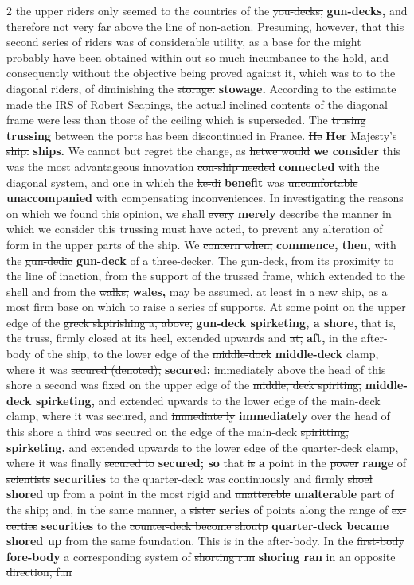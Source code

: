 \documentclass[10pt]{article}
\begin{document}
\begin{multicols}{2}
the upper riders only seemed to the countries of the \sout{you-decks,} \textbf{gun-decks,} and therefore not very far above the line of non-action. Presuming, however, that this second series of riders was of considerable utility, as a base for the might probably have been obtained within out so much incumbance to the hold, and consequently without the objective being proved against it, which was to to the diagonal riders, of diminishing the \sout{storage.} \textbf{stowage.} According to the estimate made the IRS of Robert Seapings, the actual inclined contents of the diagonal frame were less than those of the ceiling which is superseded. The \sout{trusing} \textbf{trussing} between the ports has been discontinued in France. \sout{He} \textbf{Her} Majesty's \sout{ship.} \textbf{ships.} We cannot but regret the change, as \sout{hetwe would} \textbf{we consider} this was the most advantageous innovation \sout{con-ship needed} \textbf{connected} with the diagonal system, and one in which the \sout{ke-di} \textbf{benefit} was \sout{uncomfortable} \textbf{unaccompanied} with compensating inconveniences. In investigating the reasons on which we found this opinion, we shall \sout{every} \textbf{merely} describe the manner in which we consider this trussing must have acted, to prevent any alteration of form in the upper parts of the ship. We \sout{concern when,} \textbf{commence, then,} with the \sout{gun-dedic} \textbf{gun-deck} of a three-decker. The gun-deck, from its proximity to the line of inaction, from the support of the trussed frame, which extended to the shell and from the \sout{walks,} \textbf{wales,} may be assumed, at least in a new ship, as a most firm base on which to raise a series of supports. At some point on the upper edge of the \sout{greck skpirishing a, above,} \textbf{gun-deck spirketing, a shore,} that is, the truss, firmly closed at its heel, extended upwards and \sout{at,} \textbf{aft,} in the after-body of the ship, to the lower edge of the \sout{middle-dock} \textbf{middle-deck} clamp, where it was \sout{secured (denoted),} \textbf{secured;} immediately above the head of this shore a second was fixed on the upper edge of the \sout{middle, deck spiriting,} \textbf{middle-deck spirketing,} and extended upwards to the lower edge of the main-deck clamp, where it was secured, and \sout{immediate ly} \textbf{immediately} over the head of this shore a third was secured on the edge of the main-deck \sout{spiritting,} \textbf{spirketing,} and extended upwards to the lower edge of the quarter-deck clamp, where it was finally \sout{secured to} \textbf{secured; so} that \sout{is} \textbf{a} point in the \sout{power} \textbf{range} of \sout{scientists} \textbf{securities} to the quarter-deck was continuously and firmly \sout{shoel} \textbf{shored} up from a point in the most rigid and \sout{unattereble} \textbf{unalterable} part of the ship; and, in the same manner, a \sout{sister} \textbf{series} of points along the range of \sout{ex-certies} \textbf{securities} to the \sout{counter-deck become shoutp} \textbf{quarter-deck became shored up} from the same foundation. This is in the after-body. In the \sout{first-body} \textbf{fore-body} a corresponding system of \sout{shorting run} \textbf{shoring ran} in an opposite \sout{direction, fun} 
\end{multicols}
\end{document}
